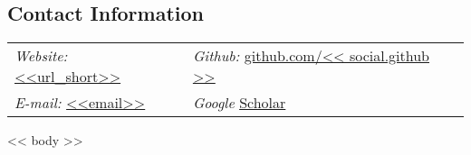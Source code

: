 \documentclass[margin,line]{res}
\begin{document}
\newcommand{\wilka}{{\bf{\color{nice_purple}Wilka Carvalho}}}

\begin{resume}

\section{\sc Contact Information}
  \vspace{.05in}
  \begin{tabular}{@{}p{2in}p{4in}}
    {\it Website:} \href{<<url>>}{\color{links}<<url_short>>} & {\it Github:}  \href{https://github.com/<< social.github >>}{\color{links}github.com/<< social.github >>} \\
    {\it E-mail:} \href{mailto:<<email>>}{\color{links}<<email>>} & {\it Google}  \href{https://scholar.google.com/citations?user=<<social.google_scholar>>&hl=en}{\color{links}Scholar} 
  \end{tabular}

<< body >>

\end{resume}
\end{document}

